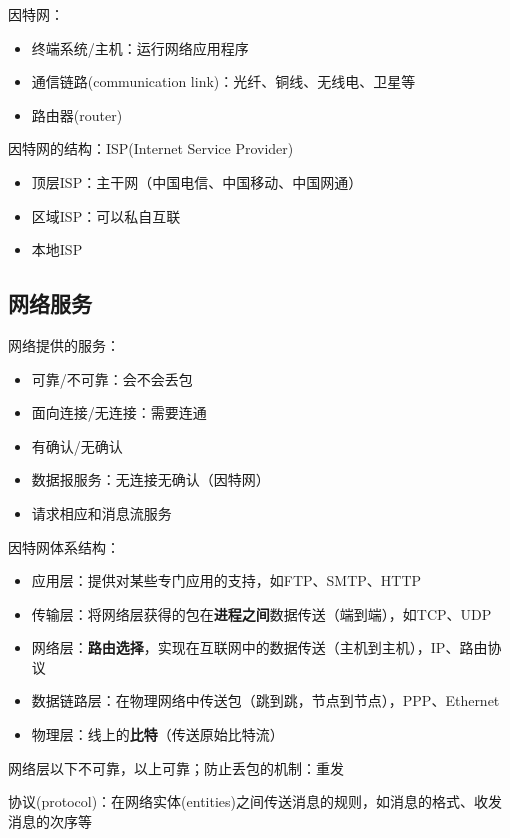 因特网：
\begin{itemize}
	\item 终端系统/主机：运行网络应用程序
	\item 通信链路(communication link)：光纤、铜线、无线电、卫星等
	\item 路由器(router)
\end{itemize}

因特网的结构：ISP(Internet Service Provider)
\begin{itemize}
	\item 顶层ISP：主干网（中国电信、中国移动、中国网通）
	\item 区域ISP：可以私自互联
	\item 本地ISP
\end{itemize}

\subsection{网络服务}
网络提供的服务：
\begin{itemize}
	\item 可靠/不可靠：会不会丢包
	\item 面向连接/无连接：需要连通
	\item 有确认/无确认
	\item 数据报服务：无连接无确认（因特网）
	\item 请求相应和消息流服务
\end{itemize}

因特网体系结构：
\begin{itemize}
	\item 应用层：提供对某些专门应用的支持，如FTP、SMTP、HTTP
	\item 传输层：将网络层获得的包在\textbf{进程之间}数据传送（端到端），如TCP、UDP
	\item 网络层：\textbf{路由选择}，实现在互联网中的数据传送（主机到主机），IP、路由协议
	\item 数据链路层：在物理网络中传送包（跳到跳，节点到节点），PPP、Ethernet
	\item 物理层：线上的\textbf{比特}（传送原始比特流）
\end{itemize}
网络层以下不可靠，以上可靠；防止丢包的机制：重发

协议(protocol)：在网络实体(entities)之间传送消息的规则，如消息的格式、收发消息的次序等

